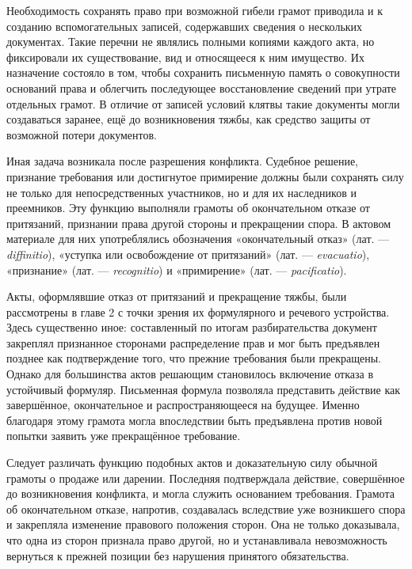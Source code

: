 Необходимость сохранять право при возможной гибели грамот приводила и к созданию вспомогательных записей, содержавших сведения о нескольких документах. Такие перечни не являлись полными копиями каждого акта, но фиксировали их существование, вид и относящееся к ним имущество. Их назначение состояло в том, чтобы сохранить письменную память о совокупности оснований права и облегчить последующее восстановление сведений при утрате отдельных грамот. В отличие от записей условий клятвы такие документы могли создаваться заранее, ещё до возникновения тяжбы, как средство защиты от возможной потери документов.

Иная задача возникала после разрешения конфликта. Судебное решение, признание требования или достигнутое примирение должны были сохранять силу не только для непосредственных участников, но и для их наследников и преемников. Эту функцию выполняли грамоты об окончательном отказе от притязаний, признании права другой стороны и прекращении спора. В актовом материале для них употреблялись обозначения «окончательный отказ» (лат. --- \emph{diffinitio}), «уступка или освобождение от притязаний» (лат. --- \emph{evacuatio}), «признание» (лат. --- \emph{recognitio}) и «примирение» (лат. --- \emph{pacificatio}).

Акты, оформлявшие отказ от притязаний и прекращение тяжбы, были рассмотрены в главе 2 с точки зрения их формулярного и речевого устройства. Здесь существенно иное: составленный по итогам разбирательства документ закреплял признанное сторонами распределение прав и мог быть предъявлен позднее как подтверждение того, что прежние требования были прекращены. Однако для большинства актов решающим становилось включение отказа в устойчивый формуляр. Письменная формула позволяла представить действие как завершённое, окончательное и распространяющееся на будущее. Именно благодаря этому грамота могла впоследствии быть предъявлена против новой попытки заявить уже прекращённое требование.

Следует различать функцию подобных актов и доказательную силу обычной грамоты о продаже или дарении. Последняя подтверждала действие, совершённое до возникновения конфликта, и могла служить основанием требования. Грамота об окончательном отказе, напротив, создавалась вследствие уже возникшего спора и закрепляла изменение правового положения сторон. Она не только доказывала, что одна из сторон признала право другой, но и устанавливала невозможность вернуться к прежней позиции без нарушения принятого обязательства.

